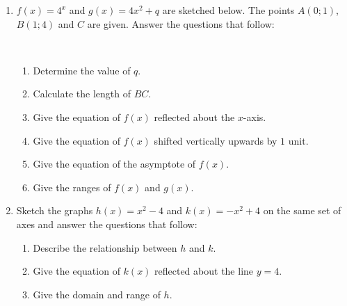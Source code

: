 \begin{eocexercises}{}
\begin{enumerate}[itemsep=9pt, label=\textbf{\arabic*}. ]
  \item$f(x)=4^x$ and $g(x)=4x^2+q$ are sketched below. The points $A(0;1)$, $B(1;4)$ and $C$ are given. Answer the questions that follow:
  \begin{center}  
\end{center}
    \\
    \begin{enumerate}[noitemsep, label=\textbf{(\alph*)} ]
    \item Determine the value of $q$.
    \item Calculate the length of $BC$.
    \item Give the equation of $f(x)$ reflected about the $x$-axis.
    \item Give the equation of $f(x)$ shifted vertically upwards by $1$ unit.
    \item Give the equation of the asymptote of $f(x)$.
\item Give the ranges of $f(x)$ and $g(x)$.
    \end{enumerate}
    
  \item Sketch the graphs $h(x)=x^2-4$ and $k(x)=-x^2+4$ on the same set of axes and answer the questions that follow: 
    \begin{enumerate}[noitemsep, label=\textbf{(\alph*)} ]
    \item Describe the relationship between $h$ and $k$.
    \item Give the equation of $k(x)$ reflected about the line $y=4$.
    \item Give the domain and range of $h$.
    \end{enumerate}
    

\end{enumerate}
\end{eocexercises}
